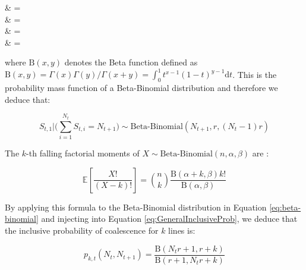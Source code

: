 \documentclass{article}
\let\oldalign\align
\let\oldendalign\endalign
\renewenvironment{align}{\linenomathNonumbers\oldalign}{\oldendalign\endlinenomath}
\renewcommand{\eqref}[1]{\ref{#1}}
\begin{document}
{\allowdisplaybreaks
	\begin{align}
		\bigg[ S_{t,1} = s \bigg| \sum_{i=1}^{N_t} S_{t,i} = N_{t+1} \bigg]
			& =  \nonumber\\
			& =  \nonumber\\
			& =    \nonumber\\
			& =  \label{eq:derivBetaBinom}
	\end{align}
}

\noindent where  $\mathrm{B}(x,y)$ denotes the Beta function defined as $\mathrm{B}(x,y)=\Gamma(x)\Gamma(y)/\Gamma(x+y)=\int_0^1 t^{x-1} (1-t)^{y-1} \mathrm{d}t$. This is the probability mass function of a Beta-Binomial distribution and therefore we deduce that:

\begin{equation}
S_{t,1} \bigg| \bigg(\sum_{i=1}^{N_t} S_{t,i} = N_{t+1} \bigg) \sim \text{Beta-Binomial}(N_{t+1},r, (N_t - 1)r)
\label{eq:beta-binomial}
\end{equation}

The $k$-th falling factorial moments of $X \sim \text{Beta-Binomial}(n,\alpha,\beta)$ are \citep{Tripathi1994}:

\begin{equation}
	\mathbb{E}\left[\frac{X!}{(X-k)!}\right]=\binom{n}{k} \frac{\mathrm{B}(\alpha+k,\beta)k!}{\mathrm{B}(\alpha,\beta)}
\end{equation}

By applying this formula to the Beta-Binomial distribution in Equation \eqref{eq:beta-binomial}
and injecting into Equation \eqref{eq:GeneralInclusiveProb}, we deduce that the inclusive probability of coalescence for $k$ lines is:

\begin{equation}
p_{k,t}(N_t, N_{t+1})=
\frac{\mathrm{B}(N_t r+1,r+k)}{\mathrm{B}(r+1,N_t r+k)}
\label{eq:NegBinInclusiveProb}
\end{equation}
\end{document}

